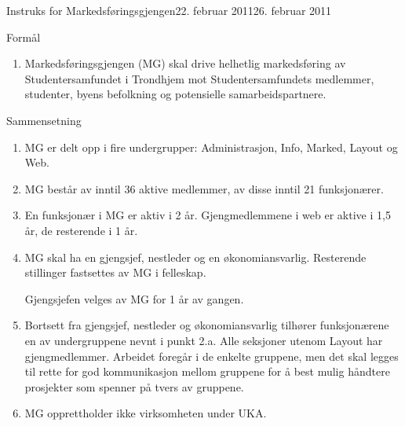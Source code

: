 \begin{instruks}{Instruks for Markedsføringsgjengen}{22. februar 2011}{26. februar 2011 }

    \begin{instruksledd}{Formål}
        \begin{enumerate}
            \item Markedsføringsgjengen (MG) skal drive helhetlig markedsføring av Studentersamfundet
                i Trondhjem mot
                Studentersamfundets medlemmer, studenter, byens befolkning og potensielle samarbeidspartnere.
        \end{enumerate}
    \end{instruksledd}

    \begin{instruksledd}{Sammensetning}
        \begin{enumerate}
            \item MG er delt opp i fire undergrupper: Administrasjon, Info, Marked, Layout og Web.
            \item MG består av inntil 36 aktive medlemmer, av disse inntil 21 funksjonærer.
            \item En funksjonær i MG er aktiv i 2 år. Gjengmedlemmene i web er aktive i 1,5 år, de
                resterende i 1 år.
            \item MG skal ha en gjengsjef, nestleder og en økonomiansvarlig. Resterende stillinger fastsettes
                av MG i felleskap.

                Gjengsjefen velges av MG for 1 år av gangen.
            \item Bortsett fra gjengsjef, nestleder og
                økonomiansvarlig tilhører funksjonærene en av undergruppene nevnt i punkt 2.a.
                Alle
                seksjoner utenom Layout har gjengmedlemmer. Arbeidet foregår i de enkelte gruppene, men det skal
                legges til
                rette for god kommunikasjon mellom gruppene for å best mulig håndtere prosjekter som spenner på
                tvers av
                gruppene.
            \item MG opprettholder ikke virksomheten under UKA.
        \end{enumerate}
    \end{instruksledd}


\end{instruks}
